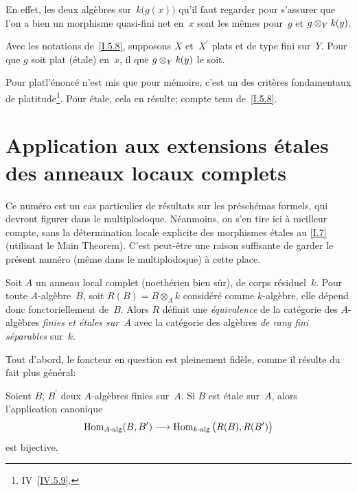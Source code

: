En effet, les deux alg\`ebres sur~$k\big(g(x)\big)$ qu'il faut
regarder pour s'assurer que l'on a bien un morphisme quasi-fini \resp net en~$x$ sont les m\^emes pour~$g$ et $g \otimes_Y \mathit{k}(y)$.

\begin{corollaire}
\label{I.5.9}
Avec
les notations de~\ref{I.5.8}, supposons $X$ et~$X^\prime$ plats
et de type fini sur~$Y$. Pour que $g$ soit plat (\resp \'etale)
en~$x$, il \fets que $g \otimes_Y \mathit{k}(y)$ le soit.
\end{corollaire}

Pour \og plat\fg l'\'enonc\'e n'est mis que pour m\'emoire, c'est
un des crit\`eres fondamentaux de platitude\footnote{\Cf IV~\ref{IV.5.9}.}. Pour \'etale, cela en r\'esulte; compte tenu
de~\ref{I.5.8}.

\section{Application aux extensions \'etales des anneaux locaux complets}
\label{I.6}

Ce num\'ero est un cas particulier de r\'esultats sur les
pr\'esch\'emas formels, qui devront figurer dans le
multiplodoque. N\'eanmoins, on s'en tire ici \`a meilleur compte,
\ie sans la d\'etermination locale explicite des morphismes
\'etales au \No\ref{I.7} (utilisant le Main Theorem). C'est peut-\^etre
une raison suffisante de garder le pr\'esent num\'ero (m\^eme
dans le multiplodoque) \`a cette place.

\begin{theoreme}
\label{I.6.1}
Soit $A$ un anneau local complet (noeth\'erien bien s\^ur), de
corps r\'esiduel~$k$. Pour toute $A$-alg\`ebre~$B$, soit $R(B) = B
\otimes_A k$ consid\'er\'e comme $k$-alg\`ebre, elle d\'epend
donc fonctoriellement de~$B$. Alors $R$ d\'efinit une
\emph{équivalence} de la cat\'egorie des $A$-alg\`ebres
\emph{finies et étales sur~$A$} avec la cat\'egorie des
alg\`ebres \emph{de rang fini séparables} sur~$k$.
\end{theoreme}

Tout d'abord, le foncteur en question est pleinement fid\`ele, comme
il r\'esulte du fait plus g\'en\'eral:

\begin{corollaire}
\label{I.6.2}
Soient $B$, $B^\prime$ deux $A$-alg\`ebres finies sur~$A$. Si $B$
est \'etale sur~$A$, alors l'application canonique
$$
\Hom_{\textup{$A$-alg}}(B,B^\prime) \to
\Hom_{\textup{$k$-alg}}\big(R(B),R(B^\prime)\big)
$$
est bijective.
\end{corollaire}

